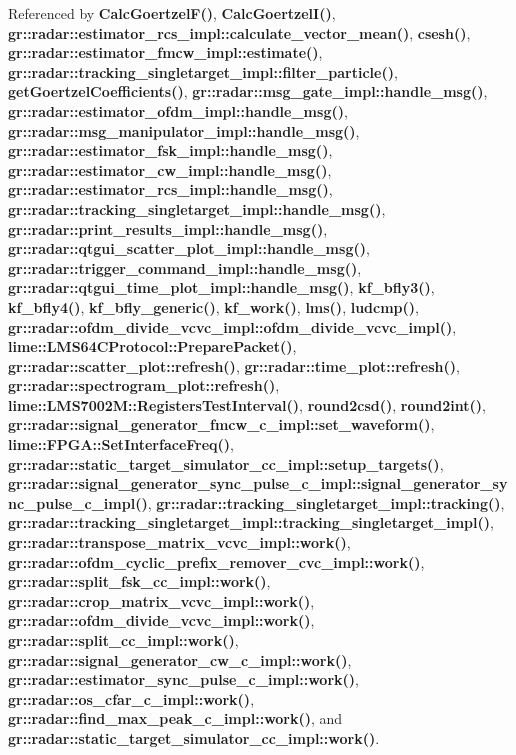 Referenced by {\bf Calc\+Goertzel\+F()}, {\bf Calc\+Goertzel\+I()}, {\bf gr\+::radar\+::estimator\+\_\+rcs\+\_\+impl\+::calculate\+\_\+vector\+\_\+mean()}, {\bf csesh()}, {\bf gr\+::radar\+::estimator\+\_\+fmcw\+\_\+impl\+::estimate()}, {\bf gr\+::radar\+::tracking\+\_\+singletarget\+\_\+impl\+::filter\+\_\+particle()}, {\bf get\+Goertzel\+Coefficients()}, {\bf gr\+::radar\+::msg\+\_\+gate\+\_\+impl\+::handle\+\_\+msg()}, {\bf gr\+::radar\+::estimator\+\_\+ofdm\+\_\+impl\+::handle\+\_\+msg()}, {\bf gr\+::radar\+::msg\+\_\+manipulator\+\_\+impl\+::handle\+\_\+msg()}, {\bf gr\+::radar\+::estimator\+\_\+fsk\+\_\+impl\+::handle\+\_\+msg()}, {\bf gr\+::radar\+::estimator\+\_\+cw\+\_\+impl\+::handle\+\_\+msg()}, {\bf gr\+::radar\+::estimator\+\_\+rcs\+\_\+impl\+::handle\+\_\+msg()}, {\bf gr\+::radar\+::tracking\+\_\+singletarget\+\_\+impl\+::handle\+\_\+msg()}, {\bf gr\+::radar\+::print\+\_\+results\+\_\+impl\+::handle\+\_\+msg()}, {\bf gr\+::radar\+::qtgui\+\_\+scatter\+\_\+plot\+\_\+impl\+::handle\+\_\+msg()}, {\bf gr\+::radar\+::trigger\+\_\+command\+\_\+impl\+::handle\+\_\+msg()}, {\bf gr\+::radar\+::qtgui\+\_\+time\+\_\+plot\+\_\+impl\+::handle\+\_\+msg()}, {\bf kf\+\_\+bfly3()}, {\bf kf\+\_\+bfly4()}, {\bf kf\+\_\+bfly\+\_\+generic()}, {\bf kf\+\_\+work()}, {\bf lms()}, {\bf ludcmp()}, {\bf gr\+::radar\+::ofdm\+\_\+divide\+\_\+vcvc\+\_\+impl\+::ofdm\+\_\+divide\+\_\+vcvc\+\_\+impl()}, {\bf lime\+::\+L\+M\+S64\+C\+Protocol\+::\+Prepare\+Packet()}, {\bf gr\+::radar\+::scatter\+\_\+plot\+::refresh()}, {\bf gr\+::radar\+::time\+\_\+plot\+::refresh()}, {\bf gr\+::radar\+::spectrogram\+\_\+plot\+::refresh()}, {\bf lime\+::\+L\+M\+S7002\+M\+::\+Registers\+Test\+Interval()}, {\bf round2csd()}, {\bf round2int()}, {\bf gr\+::radar\+::signal\+\_\+generator\+\_\+fmcw\+\_\+c\+\_\+impl\+::set\+\_\+waveform()}, {\bf lime\+::\+F\+P\+G\+A\+::\+Set\+Interface\+Freq()}, {\bf gr\+::radar\+::static\+\_\+target\+\_\+simulator\+\_\+cc\+\_\+impl\+::setup\+\_\+targets()}, {\bf gr\+::radar\+::signal\+\_\+generator\+\_\+sync\+\_\+pulse\+\_\+c\+\_\+impl\+::signal\+\_\+generator\+\_\+sync\+\_\+pulse\+\_\+c\+\_\+impl()}, {\bf gr\+::radar\+::tracking\+\_\+singletarget\+\_\+impl\+::tracking()}, {\bf gr\+::radar\+::tracking\+\_\+singletarget\+\_\+impl\+::tracking\+\_\+singletarget\+\_\+impl()}, {\bf gr\+::radar\+::transpose\+\_\+matrix\+\_\+vcvc\+\_\+impl\+::work()}, {\bf gr\+::radar\+::ofdm\+\_\+cyclic\+\_\+prefix\+\_\+remover\+\_\+cvc\+\_\+impl\+::work()}, {\bf gr\+::radar\+::split\+\_\+fsk\+\_\+cc\+\_\+impl\+::work()}, {\bf gr\+::radar\+::crop\+\_\+matrix\+\_\+vcvc\+\_\+impl\+::work()}, {\bf gr\+::radar\+::ofdm\+\_\+divide\+\_\+vcvc\+\_\+impl\+::work()}, {\bf gr\+::radar\+::split\+\_\+cc\+\_\+impl\+::work()}, {\bf gr\+::radar\+::signal\+\_\+generator\+\_\+cw\+\_\+c\+\_\+impl\+::work()}, {\bf gr\+::radar\+::estimator\+\_\+sync\+\_\+pulse\+\_\+c\+\_\+impl\+::work()}, {\bf gr\+::radar\+::os\+\_\+cfar\+\_\+c\+\_\+impl\+::work()}, {\bf gr\+::radar\+::find\+\_\+max\+\_\+peak\+\_\+c\+\_\+impl\+::work()}, and {\bf gr\+::radar\+::static\+\_\+target\+\_\+simulator\+\_\+cc\+\_\+impl\+::work()}.


